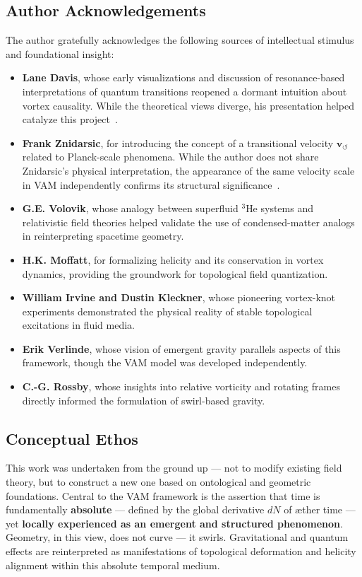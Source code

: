 \documentclass[preprint]{revtex4-2}
\begin{document}
            \subsection*{Author Acknowledgements}
            The author gratefully acknowledges the following sources of intellectual stimulus and foundational insight:
        
            \begin{itemize}
                \item \textbf{Lane Davis}, whose early visualizations and discussion of resonance-based interpretations of quantum transitions reopened a dormant intuition about vortex causality. While the theoretical views diverge, his presentation helped catalyze this project~\cite{davis2010cold}.
                \item \textbf{Frank Znidarsic}, for introducing the concept of a transitional velocity \( \mathbf{v}_{\scriptscriptstyle\boldsymbol{\circlearrowleft}} \) related to Planck-scale phenomena. While the author does not share Znidarsic's physical interpretation, the appearance of the same velocity scale in VAM independently confirms its structural significance~\cite{znidarsic2012control}.
                \item \textbf{G.E. Volovik}, whose analogy between superfluid \( ^3 \)He systems and relativistic field theories helped validate the use of condensed-matter analogs in reinterpreting spacetime geometry.
                \item \textbf{H.K. Moffatt}, for formalizing helicity and its conservation in vortex dynamics, providing the groundwork for topological field quantization.
                \item \textbf{William Irvine and Dustin Kleckner}, whose pioneering vortex-knot experiments demonstrated the physical reality of stable topological excitations in fluid media.
                \item \textbf{Erik Verlinde}, whose vision of emergent gravity parallels aspects of this framework, though the VAM model was developed independently.
                \item \textbf{C.-G. Rossby}, whose insights into relative vorticity and rotating frames directly informed the formulation of swirl-based gravity.
            \end{itemize}
        
            \subsection*{Conceptual Ethos}
            This work was undertaken from the ground up — not to modify existing field theory, but to construct a new one based on ontological and geometric foundations. Central to the VAM framework is the assertion that time is fundamentally \textbf{absolute} — defined by the global derivative \( dN \) of æther time — yet \textbf{locally experienced as an emergent and structured phenomenon}. Geometry, in this view, does not curve — it swirls. Gravitational and quantum effects are reinterpreted as manifestations of topological deformation and helicity alignment within this absolute temporal medium.
\end{document}
